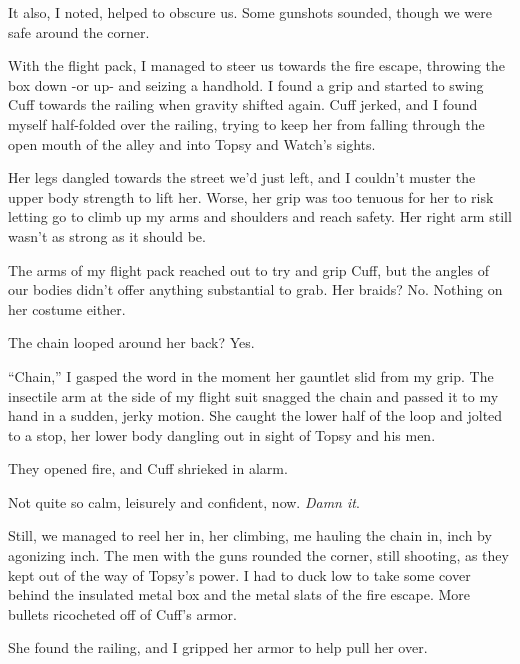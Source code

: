 It also, I noted, helped to obscure us.  Some gunshots sounded, though we were safe around the corner.



With the flight pack, I managed to steer us towards the fire escape, throwing the box down -or up- and seizing a handhold.  I found a grip and started to swing Cuff towards the railing when gravity shifted again.  Cuff jerked, and I found myself half-folded over the railing, trying to keep her from falling through the open mouth of the alley and into Topsy and Watch's sights.



Her legs dangled towards the street we'd just left, and I couldn't muster the upper body strength to lift her.  Worse, her grip was too tenuous for her to risk letting go to climb up my arms and shoulders and reach safety.  Her right arm still wasn't as strong as it should be.



The arms of my flight pack reached out to try and grip Cuff, but the angles of our bodies didn't offer anything substantial to grab.  Her braids?  No.  Nothing on her costume either.



The chain looped around her back?  Yes.



``Chain,'' I gasped the word in the moment her gauntlet slid from my grip.  The insectile arm at the side of my flight suit snagged the chain and passed it to my hand in a sudden, jerky motion.  She caught the lower half of the loop and jolted to a stop, her lower body dangling out in sight of Topsy and his men.



They opened fire, and Cuff shrieked in alarm.



Not quite so calm, leisurely and confident, now.  \emph{Damn it}.



Still, we managed to reel her in, her climbing, me hauling the chain in, inch by agonizing inch.  The men with the guns rounded the corner, still shooting, as they kept out of the way of Topsy's power.  I had to duck low to take some cover behind the insulated metal box and the metal slats of the fire escape.  More bullets ricocheted off of Cuff's armor.



She found the railing, and I gripped her armor to help pull her over.



